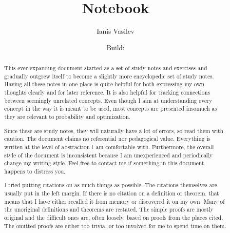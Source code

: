 \documentclass[
  headings=standardclasses,
  bibliography=totocnumbered
]{scrartcl}
\title{Notebook}
\subtitle{\URL{https://github.com/v--/notebook}}
\author{Ianis Vasilev}
\date{Build: }
\begin{document}
\hfuzz=3.5pt
\reversemarginpar
\maketitle

\begin{abstract}
  This ever-expanding document started as a set of study notes and exercises and gradually outgrew itself to become a slightly more encyclopedic set of study notes. Having all these notes in one place is quite helpful for both expressing my own thoughts clearly and for later reference. It is also helpful for tracking connections between seemingly unrelated concepts. Even though I aim at understanding every concept in the way it is meant to be used, most concepts are presented insomuch as they are relevant to probability and optimization.

  Since these are study notes, they will naturally have a lot of errors, so read them with caution. The document claims no referential nor pedagogical value. Everything is written at the level of abstraction I am comfortable with. Furthermore, the overall style of the document is inconsistent because I am unexperienced and periodically change my writing style. Feel free to contact me if something in this document happens to distress you.

  I tried putting citations on as much things as possible. The citations themselves are usually put in the left margin. If there is no citation on a definition or theorem, that means that I have either recalled it from memory or discovered it on my own. Many of the unoriginal definitions and theorems are restated. The simple proofs are mostly original and the difficult ones are, often loosely, based on proofs from the places cited. The omitted proofs are either too trivial or too involved for me to spend time on them.
\end{abstract}

\newpage
\tableofcontents
\newpage





















\end{document}
